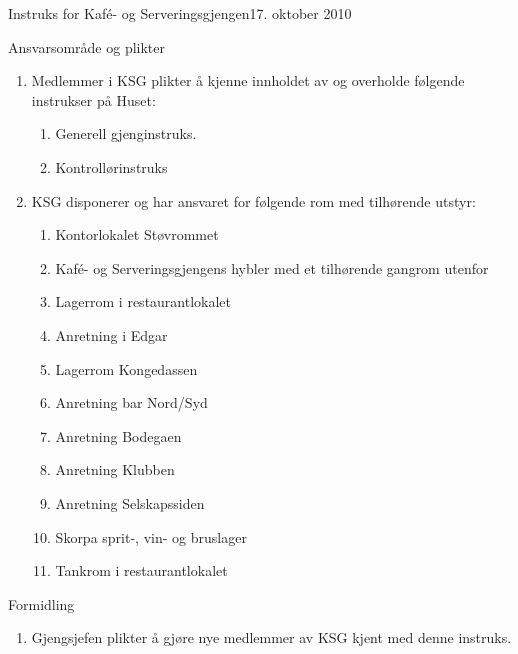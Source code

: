 \begin{instruks}{Instruks for Kafé- og Serveringsgjengen}{17. oktober 2010}{ }
    \begin{instruksledd}{Ansvarsområde og plikter}
        \begin{enumerate}
            \item  Medlemmer i KSG plikter å kjenne innholdet av og overholde følgende instrukser på
Huset:
                \begin{enumerate}
                    \item Generell gjenginstruks.
                    \item Kontrollørinstruks
                \end{enumerate}
            \item KSG disponerer og har ansvaret for følgende rom med tilhørende utstyr:
                \begin{enumerate}
                    \item Kontorlokalet Støvrommet
                    \item Kafé- og Serveringsgjengens hybler med et tilhørende gangrom utenfor
                    \item Lagerrom i restaurantlokalet
                    \item Anretning i Edgar
                    \item Lagerrom Kongedassen
                    \item Anretning bar Nord/Syd
                    \item Anretning Bodegaen
                    \item Anretning Klubben
                    \item Anretning Selskapssiden
                    \item Skorpa sprit-, vin- og bruslager
                    \item Tankrom i restaurantlokalet
                \end{enumerate}
        \end{enumerate}
    \end{instruksledd}

    \begin{instruksledd}{Formidling}
        \begin{enumerate}
            \item Gjengsjefen plikter å gjøre nye medlemmer av KSG kjent med denne instruks.
        \end{enumerate}
    \end{instruksledd}

\end{instruks}


